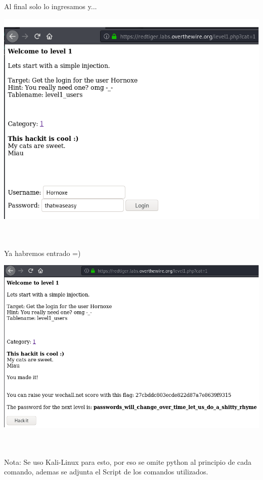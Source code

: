 \documentclass[11pt,letterpaper]{article}
\begin{document}
Al final solo lo ingresamos y...
\begin{center}
\includegraphics[scale=.6]{./Img/sqlmap6.png}
\end{center}~\\~\\
Ya habremos entrado =)
\begin{center}
\includegraphics[scale=.6]{./Img/sqlmap7.png}
\end{center}~\\~\\
Nota: Se uso Kali-Linux para esto, por eso se omite python al principio de cada comando, ademas se adjunta el Script de los comandos utilizados.
\end{document}
